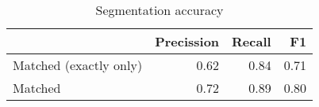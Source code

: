 \begin{table}[!ht]
\centering
\begin{tabular}{lrrr}
\toprule
{} &  Precission &  Recall &   F1 \\
\midrule
Matched (exactly only) &        0.62 &    0.84 & 0.71 \\
Matched                &        0.72 &    0.89 & 0.80 \\
\bottomrule
\end{tabular}
\caption{Segmentation accuracy}
\label{tab:segmentation-accuracy}
\end{table}